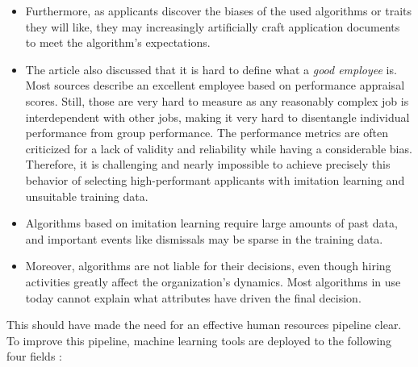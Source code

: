 \documentclass[draft,final]{thesisclass} %
\begin{document}
\begin{enumerate}
\begin{itemize}
        \item Furthermore, as applicants discover the biases of the used algorithms or traits they will like, they may increasingly artificially craft application documents to meet the algorithm's expectations.
        \item The article also discussed that it is hard to define what a \textit{good employee} is. Most sources describe an excellent employee based on performance appraisal scores. Still, those are very hard to measure as any reasonably complex job is interdependent with other jobs, making it very hard to disentangle individual performance from group performance. The performance metrics are often criticized for a lack of validity and reliability while having a considerable bias. Therefore, it is challenging and nearly impossible to achieve precisely this behavior of selecting high-performant applicants with imitation learning and unsuitable training data.
        \item Algorithms based on imitation learning require large amounts of past data, and important events like dismissals may be sparse in the training data.
        \item Moreover, algorithms are not liable for their decisions, even though hiring activities greatly affect the organization's dynamics. Most algorithms in use today cannot explain what attributes have driven the final decision.
    \end{itemize}
\end{enumerate}
This should have made the need for an effective human resources pipeline clear. To improve this pipeline, machine learning tools are deployed to the following four fields \parencite[4-8]{ai_recruiting}:
\end{document}
